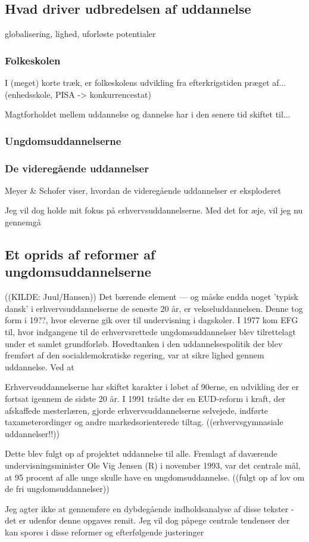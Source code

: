 \subsection{Hvad driver udbredelsen af uddannelse}


globalisering, lighed, uforløste potentialer

\subsubsection{Folkeskolen}
I (meget) korte træk, er folkeskolens udvikling fra efterkrigstiden præget af... (enhedsskole, PISA -> konkurrencestat)

Magtforholdet mellem uddannelse og dannelse har i den senere tid skiftet til...

\subsubsection{Ungdomsuddannelserne}

\subsubsection{De videregående uddannelser}
Meyer & Schofer  viser, hvordan de videregående uddannelser er eksploderet 

Jeg vil dog holde mit fokus på erhvervsuddannelserne.
Med det for æje, vil jeg nu gennemgå 
\subsection{Et oprids af reformer af ungdomsuddannelserne}
((KILDE: Juul/Hansen))
Det bærende element --- og måske endda noget 'typisk dansk' i erhvervsuddannelserne de seneste 20 år, er vekseluddannelsen.
Denne tog form i 19??, hvor eleverne gik over til undervisning i dagskoler.
I 1977 kom EFG til, hvor indgangene til de erhvervsrettede ungdomsuddannelser blev tilrettelagt under et samlet grundforløb.
Hovedtanken i den uddannelsespolitik der blev fremført af den socialdemokratiske regering, var at sikre lighed gennem uddannelse.
Ved at 

Erhvervsuddannelserne har skiftet karakter i løbet af 90erne, en udvikling der er fortsat igennem de sidste 20 år.
I 1991 trådte der en EUD-reform i kraft, der afskaffede mesterlæren, gjorde erhvervsuddannelserne selvejede, indførte taxameterordinger og andre markedsorienterede tiltag.
((erhvervsgymnasiale uddannelser!!))


Dette blev fulgt op af projektet uddannelse til alle.
Fremlagt af daværende undervisningsminister Ole Vig Jensen (R) i november 1993, var det centrale mål, at 95 procent af alle unge skulle have en ungdomsuddannelse.
((fulgt op af lov om de fri ungdomsuddannelser))

Jeg agter ikke at gennemføre en dybdegående indholdsanalyse af disse tekster - det er udenfor denne opgaves remit.
Jeg vil dog påpege centrale tendenser der kan spores i disse reformer og efterfølgende justeringer
